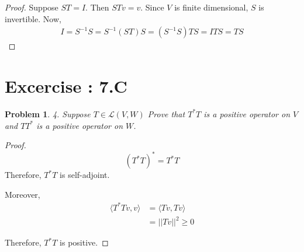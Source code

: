 \documentclass[12pt]{book}
\newtheorem*{problem*}{Problem}
\newcommand{\LL}{\mathcal{L}}
\begin{document}
\begin{proof}
  Suppose $ST = I$. Then $STv = v$. Since $V$ is finite dimensional, $S$ is invertible. Now,
  \begin{align*}
    I = S^{-1}S = S^{-1}(ST)S = (S^{-1}S)TS = ITS = TS
  \end{align*}
\end{proof}


\section{Excercise : 7.C}

\begin{problem*}
4. Suppose $T \in \LL(V,W)$ Prove that $T^*T$ is a positive operator on $V$ and $TT^*$ is a positive operator on $W$. 
\end{problem*}

\begin{proof}
  \[
  (T^{*}T)^* = T^*T
  \]
  Therefore, $T^{*}T$ is self-adjoint.

  Moreover,
  \begin{align*}
    \langle T^{*}Tv, v \rangle & = \langle Tv, Tv \rangle\\
    & = ||Tv||^2 \ge 0
  \end{align*}

Therefore, $T^{*}T$ is positive. 
\end{proof}

\end{document}
